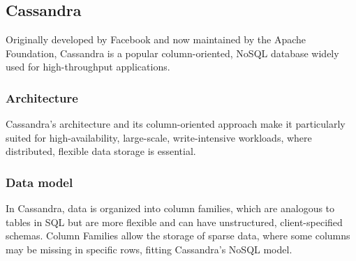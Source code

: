 \subsection{Cassandra}
Originally developed by Facebook and now maintained by the Apache Foundation, Cassandra is a popular column-oriented, NoSQL database widely used for high-throughput applications. 


\subsubsection{Architecture}
Cassandra's architecture and its column-oriented approach make it particularly suited for high-availability, large-scale, write-intensive workloads, where distributed, flexible data storage is essential.







\subsubsection{Data model}
In Cassandra, data is organized into column families, which are analogous to tables in SQL but are more flexible and can have unstructured, client-specified schemas. 
Column Families allow the storage of sparse data, where some columns may be missing in specific rows, fitting Cassandra's NoSQL model.

